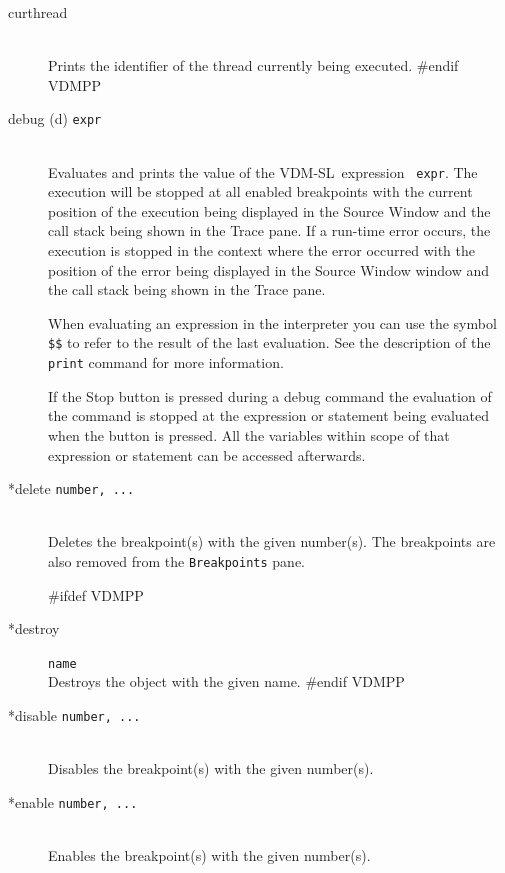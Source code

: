 \documentclass[\pformat,12pt]{article}
\newcommand{\vdmslpp}{VDM-SL}
\newcommand{\vdmslpp}{VDM++}
\newcommand{\guicmd}[1]{{\sf #1}}
\newcommand{\guicmd}[1]{{\gt #1}}
\begin{document}
\begin{description}
\item[curthread]\mbox{}\\
  Prints the identifier of the thread currently being executed.
#endif VDMPP

\item[debug (d) {\tt expr}]  \mbox{}\\
  Evaluates and prints the value of the \vdmslpp\ expression {\tt
    expr}.  The execution will be stopped at all enabled breakpoints
   with the current position of the execution being
  displayed in the  \guicmd{Source Window} and the call stack being
  shown in the 
  \guicmd{Trace} pane. If a run-time error occurs, the
  execution is stopped in the context where the error occurred
  with the position of the error being displayed in the \guicmd{Source Window}
  window and the call stack being shown in the \guicmd{Trace}
  pane.
  
  When evaluating an expression in the interpreter you can use the 
  symbol {\tt \$\$}\index{\$\$} to refer to the result of the last
  evaluation. See the description of the {\tt print} command for more
  information.
  
  If the \guicmd{Stop} button is pressed during a
  debug 
  command the evaluation of the command is stopped at the expression
  or statement being evaluated when the button is pressed. All the
  variables within scope of that expression or statement can be
  accessed afterwards.
  
\item[*delete {\tt number, ...}] 
\mbox{}\\
  Deletes the breakpoint(s) with the given number(s). The breakpoints
  are also removed from the \texttt{Breakpoints} pane.
  
#ifdef VDMPP
\item[*destroy] {\tt name}\mbox{}\\
  Destroys the object with the given name.
#endif VDMPP

\item[*disable \texttt{number, ...}]
\mbox{}\\
  Disables the breakpoint(s) with the given number(s).
  
\item[*enable \texttt{number, ...}]
\mbox{}\\
  Enables the breakpoint(s) with the given number(s).
  

\end{description}
\end{document}
